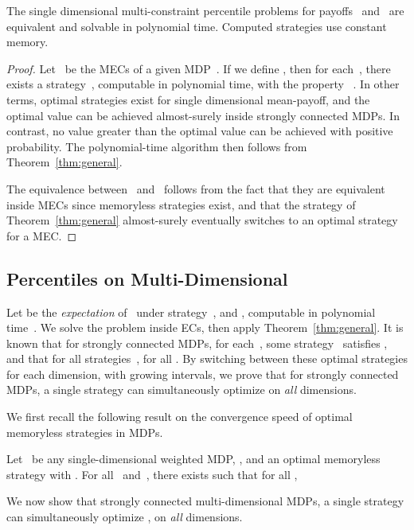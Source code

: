 \documentclass{llncs}
\begin{document}
\begin{theorem}
  The single dimensional multi-constraint percentile problems for payoffs~ and~ are equivalent and solvable in polynomial time.
  Computed strategies use constant memory.
\end{theorem}

\begin{proof}
  Let~ be the MECs of a given MDP~.
  If we define ,
  then for each~, there exists a strategy~, computable in polynomial time, with the property
  ~\cite{Puterman-wiley94}. In other terms, optimal strategies exist for single dimensional mean-payoff,
  and the optimal value can be achieved almost-surely inside strongly connected MDPs.
  In contrast,  no value greater than the optimal value can be achieved with positive probability. 
  The polynomial-time algorithm then follows from Theorem~\ref{thm:general}.

  The equivalence between~ and~ follows from the fact that they are equivalent inside MECs since
  memoryless strategies exist, and that the strategy of Theorem~\ref{thm:general} almost-surely eventually switches to 
  an optimal strategy for a MEC.
\end{proof}

\subsection{Percentiles on Multi-Dimensional }

Let  be the \emph{expectation} of~ under strategy~,
and , computable in polynomial time~\cite{Puterman-wiley94}.
We solve the problem inside ECs, then apply Theorem~\ref{thm:general}.
It is known that for strongly connected MDPs, for each~, some strategy~ satisfies ,
and that for all strategies~,  for all .
By switching between these optimal strategies for each dimension, with growing
intervals, we prove that
for strongly connected MDPs, a single strategy can simultaneously optimize  on \emph{all} dimensions.

We first recall the following result on the convergence speed of optimal memoryless strategies
in MDPs.

\begin{lemma}
  \label{lemma:boundk}
  Let~ be any single-dimensional weighted MDP, ,
  and  an optimal memoryless strategy with .
  For all~ and~, there exists  such that  for all ,
  
\end{lemma}

We now show that strongly connected multi-dimensional MDPs, a single strategy can simultaneously optimize , on \textit{all} dimensions.
\end{document}
